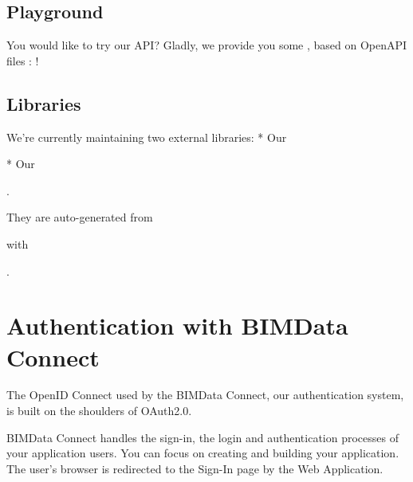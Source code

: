 \documentclass[a4paper,12pt,english]{sphinxmanual}
\begin{document}
\subsection{Playground}
\label{\detokenize{api/introduction:playground}}
You would like to try our API? Gladly, we provide you some , based on OpenAPI files : !


\subsection{Libraries}
\label{\detokenize{api/introduction:libraries}}
We’re currently maintaining two external libraries:
* Our %
\begin{footnote}[3]\sphinxAtStartFootnote
{}
%
\end{footnote}
* Our %
\begin{footnote}[4]\sphinxAtStartFootnote
{}
%
\end{footnote}.

They are auto-generated from %
\begin{footnote}[5]\sphinxAtStartFootnote
{}
%
\end{footnote} with %
\begin{footnote}[6]\sphinxAtStartFootnote
{}
%
\end{footnote}.


\section{Authentication with BIMData Connect}
\label{\detokenize{guide/authentication_bimdata_connect:authentication-with-bimdata-connect}}\label{\detokenize{guide/authentication_bimdata_connect::doc}}
The OpenID Connect used by the BIMData Connect, our authentication system, is built on the shoulders of OAuth2.0.

BIMData Connect handles the sign-in, the login and authentication processes of your application users.
You can focus on creating and building your application.
The user’s browser is redirected to the Sign-In page by the Web Application.
\end{document}
